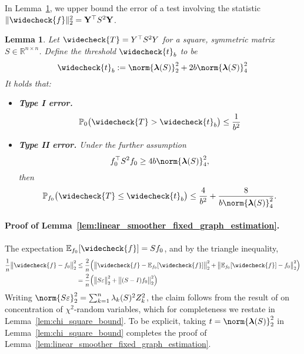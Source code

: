 \documentclass[twoside]{article}
\newcommand{\Reals}{\mathbb{R}}
\newcommand{\1}{\mathbf{1}}
\newcommand{\lambdavec}{\boldsymbol{\lambda}}
\newcommand{\Pbb}{\mathbb{P}}
\newcommand{\Ebb}{\mathbb{E}}
\newcommand{\wc}[1]{\widecheck{#1}}
\newtheorem{lemma}{Lemma}
\theoremstyle{definition}
\theoremstyle{remark}
\begin{document}
In Lemma~\ref{lem:linear_smoother_fixed_graph_testing}, we upper bound the error of a test involving the statistic $\|\wc{f}\|_2^2 = {\bf Y}^{\top} S^2 {\bf Y}$.
\begin{lemma}
	\label{lem:linear_smoother_fixed_graph_testing}
	Let $\wc{T} = Y^{\top} S^2 Y$ for a square, symmetric matrix $S \in \Reals^{n \times n}$. Define the threshold $\wc{t}_b$ to be 
	\begin{equation}
	\wc{t}_{b} := \norm{\lambdavec(S)}_2^2 + 2b \norm{\lambdavec(S)}_4^2
	\end{equation}
	It holds that:
	\begin{itemize}
		\item \textbf{Type I error.}
		\begin{equation}
		\label{eqn:linear_smoother_fixed_graph_testing_typeI}
		\Pbb_0\bigl(\wc{T} > \wc{t}_b\bigr) \leq \frac{1}{b^2}
		\end{equation}
		\item \textbf{Type II error.} Under the further assumption
		\begin{equation}
		\label{eqn:linear_smoother_fixed_graph_testing_critical_radius}
		f_0^{\top} S^2 f_0 \geq 4b \norm{\lambdavec(S)}_4^2,
		\end{equation}
		then
		\begin{equation}
		\label{eqn:linear_smoother_fixed_graph_testing_typeII}
		\Pbb_{f_0}\bigl(\wc{T} \leq \wc{t}_b\bigr) \leq \frac{4}{b^2} + \frac{8}{b \norm{\lambdavec(S)}_4^{2}}.
		\end{equation}
	\end{itemize}
\end{lemma}

\paragraph{Proof of Lemma~\ref{lem:linear_smoother_fixed_graph_estimation}.}
The expectation $\Ebb_{f_0}[\wc{f}] = Sf_0$, and by the triangle inequality,
\begin{align*}
\frac{1}{n}\bigl\|\wc{f} - f_0\bigr\|_2^2 & \leq \frac{2}{n}\Bigl(\bigl\|\wc{f} - \Ebb_{f_0}[\wc{f}]\bigr\|_2^2 + \bigl\|\Ebb_{f_0}[\wc{f}] - f_0\bigr\|_2^2\Bigr) \\ 
& = \frac{2}{n}\Bigl(\bigl\|S\varepsilon\bigr\|_2^2 + \bigl\|(S - I)f_0\bigr\|_2^2\Bigr)
\end{align*}
Writing $\norm{S\varepsilon}_2^2 = \sum_{k = 1}^{n} \lambda_k(S)^2 Z_k^2$, the claim follows from the result of \citet{laurent00} on concentration of $\chi^2$-random variables, which for completeness we restate in Lemma~\ref{lem:chi_square_bound}. To be explicit, taking $t = \norm{\lambdavec(S)}_2^2$ in Lemma~\ref{lem:chi_square_bound} completes the proof of Lemma~\ref{lem:linear_smoother_fixed_graph_estimation}. 
\end{document}

